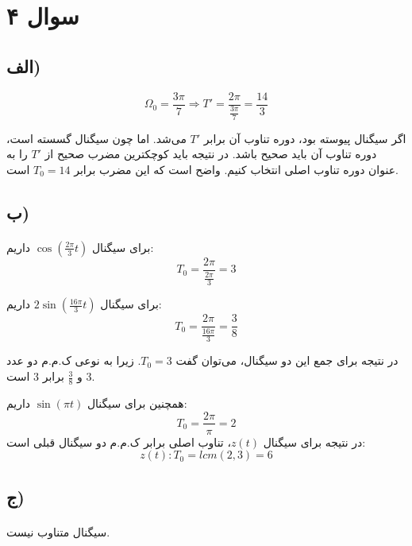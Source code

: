 \documentclass{article}
\begin{document}
	\section*{سوال ۴}
	\subsection*{الف)}

	\begin{equation*}
		\Omega_0 = \frac{3 \pi}{7} \Rightarrow T' = \frac{2 \pi}{\frac{3 \pi}{7}}
		= \frac{14}{3}
	\end{equation*}

	اگر سیگنال پیوسته بود، دوره تناوب آن برابر
	$T'$
	می‌شد. اما چون سیگنال گسسته است، دوره تناوب آن باید صحیح باشد. در نتیجه باید
	کوچکترین مضرب صحیح از
	$T'$
	را به عنوان دوره تناوب اصلی انتخاب کنیم. واضح است که این مضرب برابر
	$T_0 = 14$
	است.

	\subsection*{ب)}
	\paragraph*{}
	برای سیگنال
	$\cos(\frac{2 \pi}{3} t)$
	داریم:
	\begin{equation*}
		T_0 = \frac{2 \pi}{\frac{2 \pi}{3}} = 3
	\end{equation*}

	برای سیگنال
	$2\sin(\frac{16 \pi}{3} t)$
	داریم:
	\begin{equation*}
		T_0 = \frac{2 \pi}{\frac{16 \pi}{3}} = \frac{3}{8}
	\end{equation*}

	در نتیجه برای جمع این دو سیگنال، می‌توان گفت
	$T_0 = 3$.
	زیرا به نوعی ک.م.م دو عدد
	$3$
	و
	$\frac{3}{8}$
	برابر
	$3$
	است.

	همچنین برای سیگنال
	$\sin(\pi t)$
	داریم:
	\begin{equation*}
		T_0 = \frac{2 \pi}{\pi} = 2
	\end{equation*}
	در نتیجه برای سیگنال
	$z(t)$،
	تناوب اصلی برابر ک.م.م دو سیگنال قبلی است:
	\begin{equation*}
		z(t) : T_0 = lcm(2, 3) = 6
	\end{equation*}

	\subsection*{ج)}
	\paragraph*{}
	سیگنال متناوب نیست.
\end{document}
